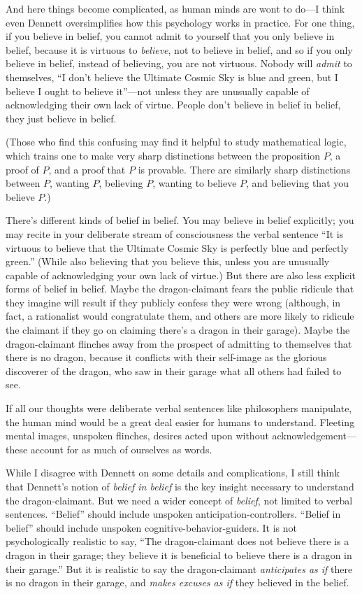 {
 And here things become complicated, as human minds are wont to
do---I think even Dennett oversimplifies how this psychology works in
practice. For one thing, if you believe in belief, you cannot admit to
yourself that you only believe in belief, because it is virtuous to
\textit{believe}, not to believe in belief, and so if you only believe
in belief, instead of believing, you are not virtuous. Nobody will
\textit{admit} to themselves, ``I
don't believe the Ultimate Cosmic Sky is blue and
green, but I believe I ought to believe it''---not
unless they are unusually capable of acknowledging their own lack of
virtue. People don't believe in belief in belief, they
just believe in belief.}

{
 (Those who find this confusing may find it helpful to study
mathematical logic, which trains one to make very sharp distinctions
between the proposition $P$, a proof of $P$, and a proof that $P$ is
provable. There are similarly sharp distinctions between $P$, wanting $P$,
believing $P$, wanting to believe $P$, and believing that you believe $P$.)}

{
 There's different kinds of belief in belief. You
may believe in belief explicitly; you may recite in your deliberate
stream of consciousness the verbal sentence ``It is
virtuous to believe that the Ultimate Cosmic Sky is perfectly blue and
perfectly green.'' (While also believing that you
believe this, unless you are unusually capable of acknowledging your
own lack of virtue.) But there are also less explicit forms of belief
in belief. Maybe the dragon-claimant fears the public ridicule that
they imagine will result if they publicly confess they were wrong
(although, in fact, a rationalist would congratulate them, and others
are more likely to ridicule the claimant if they go on claiming
there's a dragon in their garage). Maybe the
dragon-claimant flinches away from the prospect of admitting to
themselves that there is no dragon, because it conflicts with their
self-image as the glorious discoverer of the dragon, who saw in their
garage what all others had failed to see.}

{
 If all our thoughts were deliberate verbal sentences like
philosophers manipulate, the human mind would be a great deal easier
for humans to understand. Fleeting mental images, unspoken flinches,
desires acted upon without acknowledgement---these account for as much
of ourselves as words.}

{
 While I disagree with Dennett on some details and complications, I
still think that Dennett's notion of \textit{belief in
belief} is the key insight necessary to understand the dragon-claimant.
But we need a wider concept of \textit{belief}, not limited to verbal
sentences. ``Belief'' should include
unspoken anticipation-controllers. ``Belief in
belief'' should include unspoken
cognitive-behavior-guiders. It is not psychologically realistic to say,
``The dragon-claimant does not believe there is a
dragon in their garage; they believe it is beneficial to believe there
is a dragon in their garage.'' But it is realistic to
say the dragon-claimant \textit{anticipates as if} there is no dragon
in their garage, and \textit{makes excuses as if} they believed in the
belief.}

